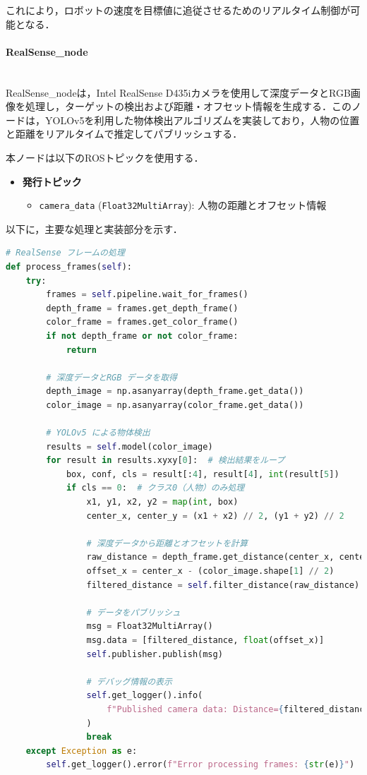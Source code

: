 これにより，ロボットの速度を目標値に追従させるためのリアルタイム制御が可能となる．


\paragraph{RealSense\_node}\mbox{}\\
RealSense\_nodeは，Intel RealSense D435iカメラを使用して深度データとRGB画像を処理し，ターゲットの検出および距離・オフセット情報を生成する．このノードは，YOLOv5を利用した物体検出アルゴリズムを実装しており，人物の位置と距離をリアルタイムで推定してパブリッシュする．

本ノードは以下のROSトピックを使用する．
\begin{itemize}
    \item \textbf{発行トピック}
          \begin{itemize}
              \item \texttt{camera\_data} (\texttt{Float32MultiArray}): 人物の距離とオフセット情報
          \end{itemize}
\end{itemize}

以下に，主要な処理と実装部分を示す．

\begin{lstlisting}[language=Python, caption=ターゲット検出と距離推定 (RealSense\_node.py)]
# RealSense フレームの処理
def process_frames(self):
    try:
        frames = self.pipeline.wait_for_frames()
        depth_frame = frames.get_depth_frame()
        color_frame = frames.get_color_frame()
        if not depth_frame or not color_frame:
            return

        # 深度データとRGB データを取得
        depth_image = np.asanyarray(depth_frame.get_data())
        color_image = np.asanyarray(color_frame.get_data())

        # YOLOv5 による物体検出
        results = self.model(color_image)
        for result in results.xyxy[0]:  # 検出結果をループ
            box, conf, cls = result[:4], result[4], int(result[5])
            if cls == 0:  # クラス0（人物）のみ処理
                x1, y1, x2, y2 = map(int, box)
                center_x, center_y = (x1 + x2) // 2, (y1 + y2) // 2

                # 深度データから距離とオフセットを計算
                raw_distance = depth_frame.get_distance(center_x, center_y)
                offset_x = center_x - (color_image.shape[1] // 2)
                filtered_distance = self.filter_distance(raw_distance)

                # データをパブリッシュ
                msg = Float32MultiArray()
                msg.data = [filtered_distance, float(offset_x)]
                self.publisher.publish(msg)

                # デバッグ情報の表示
                self.get_logger().info(
                    f"Published camera data: Distance={filtered_distance:.2f}, Offset={offset_x}"
                )
                break
    except Exception as e:
        self.get_logger().error(f"Error processing frames: {str(e)}")
\end{lstlisting}

